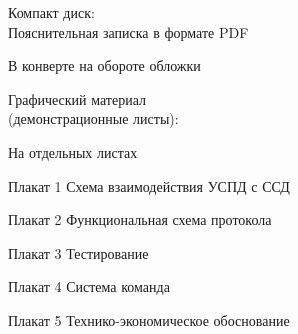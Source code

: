 


 
 
 
 
 \newpage
 \tableofcontents
 \vspace{1cm}
 \begin{minipage}[left]{0.6\linewidth}
  Компакт диск: \\
  Пояснительная записка в формате PDF
 \end{minipage}
 \hfill
 \begin{minipage}[right]{0.3\linewidth}
  В конверте на обороте обложки 
 \end{minipage}
 
 \vspace{1cm}
 
 \begin{minipage}[left]{0.6\linewidth}
  Графический материал \\ (демонстрационные листы):
 \end{minipage}
 \hfill
 \begin{minipage}[right]{0.3\linewidth}
  На отдельных листах
 \end{minipage}
 
 \vspace{1cm}
 
 Плакат 1 Схема взаимодействия УСПД с ССД
 
 Плакат 2 Функциональная схема протокола

 Плакат 3 Тестирование
 
 Плакат 4 Система команда 
 
 Плакат 5 Технико-экономическое обоснование
 
 
 
 
 
 
 \newpage
 \renewcommand{\refname}{\hfill Список использованных источников \hfill}
 
 


